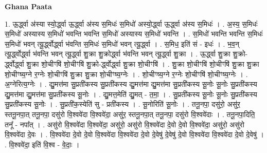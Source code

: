 \documentclass[17pt]{extarticle}
\begin{document}
\textbf{Ghana Paata } \newline

1. ऊ॒र्द्ध्वा अ॑स्या स्यो॒र्द्ध्वा ऊ॒र्द्ध्वा अ॑स्य स॒मिधः॑ स॒मिधो॑ अस्यो॒र्द्ध्वा ऊ॒र्द्ध्वा अ॑स्य स॒मिधः॑ । . अ॒स्य॒ स॒मिधः॑ स॒मिधो॑ अस्यास्य स॒मिधो॑ भवन्ति भवन्ति स॒मिधो॑ अस्यास्य स॒मिधो॑ भवन्ति । . स॒मिधो॑ भवन्ति भवन्ति स॒मिधः॑ स॒मिधो॑ भवन् त्यू॒र्द्ध्वोर्द्ध्वा भ॑वन्ति स॒मिधः॑ स॒मिधो॑ भवन् त्यू॒र्द्ध्वा । . स॒मिध॒ इति॑ सं - इधः॑ । . भ॒व॒न् त्यू॒र्द्ध्वोर्द्ध्वा भ॑वन्ति भवन् त्यू॒र्द्ध्वा शु॒क्रा शु॒क्रोर्द्ध्वा भ॑वन्ति भवन् त्यू॒र्द्ध्वा शु॒क्रा । . ऊ॒र्द्ध्वा शु॒क्रा शु॒क्रो-र्द्ध्वोर्द्ध्वा शु॒क्रा शो॒चीꣳषि॑ शो॒चीꣳषि॑ शु॒क्रो-र्द्ध्वोर्द्ध्वा शु॒क्रा शो॒चीꣳषि॑ । . शु॒क्रा शो॒चीꣳषि॑ शो॒चीꣳषि॑ शु॒क्रा शु॒क्रा शो॒चीꣳष्य॒ग्ने र॒ग्नेः शो॒चीꣳषि॑ शु॒क्रा शु॒क्रा शो॒चीꣳष्य॒ग्नेः । . शो॒चीꣳष्य॒ग्ने र॒ग्नेः शो॒चीꣳषि॑ शो॒चीꣳष्य॒ग्नेः । . अ॒ग्नेरित्य॒ग्नेः । . द्यु॒मत्त॑मा सु॒प्रती॑कस्य सु॒प्रती॑कस्य द्यु॒मत्त॑मा द्यु॒मत्त॑मा सु॒प्रती॑कस्य सू॒नोः सू॒नोः सु॒प्रती॑कस्य द्यु॒मत्त॑मा द्यु॒मत्त॑मा सु॒प्रती॑कस्य सू॒नोः । . द्यु॒मत्त॒मेति॑ द्यु॒मत् - त॒मा॒ । . सु॒प्रती॑कस्य सू॒नोः सू॒नोः सु॒प्रती॑कस्य सु॒प्रती॑कस्य सू॒नोः । . सु॒प्रती॑क॒स्येति॑ सु - प्रती॑कस्य । . सू॒नोरिति॑ सू॒नोः । . तनू॒नपा॒ दसु॑रो॒ असु॑र॒ स्तनू॒नपा॒त् तनू॒नपा॒ दसु॑रो वि॒श्ववे॑दा वि॒श्ववे॑दा॒ असु॑र॒ स्तनू॒नपा॒त् तनू॒नपा॒ दसु॑रो वि॒श्ववे॑दाः । . तनू॒नपा॒दिति॒ तनू᳚ - नपा᳚त् । . असु॑रो वि॒श्ववे॑दा वि॒श्ववे॑दा॒ असु॑रो॒ असु॑रो वि॒श्ववे॑दा दे॒वो दे॒वो वि॒श्ववे॑दा॒ असु॑रो॒ असु॑रो वि॒श्ववे॑दा दे॒वः । . वि॒श्ववे॑दा दे॒वो दे॒वो वि॒श्ववे॑दा वि॒श्ववे॑दा दे॒वो दे॒वेषु॑ दे॒वेषु॑ दे॒वो वि॒श्ववे॑दा वि॒श्ववे॑दा दे॒वो दे॒वेषु॑ । . वि॒श्ववे॑दा॒ इति॑ वि॒श्व - वे॒दाः॒ । \newline
\end{document}
